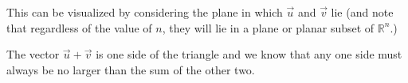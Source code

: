 This can be visualized by considering the plane in which $\vec{u}$ and $\vec{v}$ lie (and note that regardless of the value of $n$, they will lie in a plane or planar subset of $\mathbb{R}^n$.)


\begin{center}
\end{center}

The vector $\vec{u}+\vec{v}$ is one side of the triangle and we know that any one side must always be no larger than the sum of the other two.  


